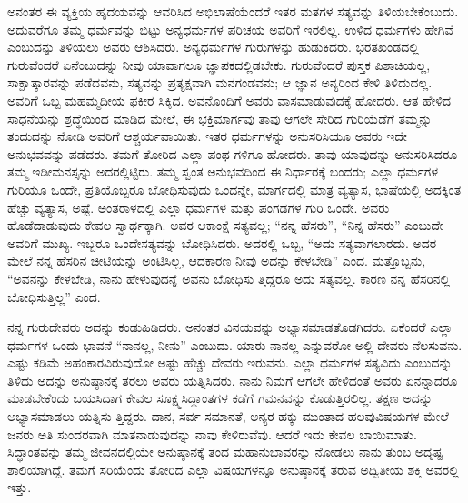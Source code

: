 ಅನಂತರ ಈ ವ್ಯಕ್ತಿಯ ಹೃದಯವನ್ನು ಆವರಿಸಿದ ಅಭಿಲಾಷೆಯೆಂದರೆ ಇತರ ಮತಗಳ ಸತ್ಯವನ್ನು ತಿಳಿಯಬೇಕೆಂಬುದು. ಅದುವರೆಗೂ ತಮ್ಮ ಧರ್ಮವನ್ನು ಬಿಟ್ಟು ಅನ್ಯಧರ್ಮಗಳ ಪರಿಚಯ ಅವರಿಗೆ ಇರಲಿಲ್ಲ. ಉಳಿದ ಧರ್ಮಗಳು ಹೇಗಿವೆ ಎಂಬುದನ್ನು ತಿಳಿಯಲು ಅವರು ಆಶಿಸಿದರು. ಅನ್ಯಧರ್ಮಗಳ ಗುರುಗಳನ್ನು ಹುಡುಕಿದರು. ಭರತಖಂಡದಲ್ಲಿ ಗುರುವೆಂದರೆ ಏನೆಂಬುದನ್ನು ನೀವು ಯಾವಾಗಲೂ ಜ್ಞಾಪಕದಲ್ಲಿಡಬೇಕು. ಗುರುವೆಂದರೆ ಪುಸ್ತಕ ಪಿಶಾಚಿಯಲ್ಲ, ಸಾಕ್ಷಾತ್ಕಾರವನ್ನು ಪಡೆದವನು, ಸತ್ಯವನ್ನು ಪ್ರತ್ಯಕ್ಷವಾಗಿ ಮನಗಂಡವನು; ಆ ಜ್ಞಾನ ಅನ್ಯರಿಂದ ಕೇಳಿ ತಿಳಿದುದಲ್ಲ. ಅವರಿಗೆ ಒಬ್ಬ ಮಹಮ್ಮದೀಯ ಫಕೀರ ಸಿಕ್ಕಿದ. ಅವನೊಂದಿಗೆ ಅವರು ವಾಸಮಾಡುವುದಕ್ಕೆ ಹೋದರು. ಆತ ಹೇಳಿದ ಸಾಧನೆಯನ್ನು ಶ್ರದ್ಧೆಯಿಂದ ಮಾಡಿದ ಮೇಲೆ, ಈ ಭಕ್ತಿಮಾರ್ಗವು ತಾವು ಆಗಲೇ ಸೇರಿದ ಗುರಿಯೆಡೆಗೆ ತಮ್ಮನ್ನು ತಂದುದನ್ನು ನೋಡಿ ಅವರಿಗೆ ಆಶ್ಚರ್ಯವಾಯಿತು. ಇತರ ಧರ್ಮಗಳನ್ನು ಅನುಸರಿಸಿಯೂ ಅವರು ಇದೇ ಅನುಭವವನ್ನು ಪಡೆದರು. ತಮಗೆ ತೋರಿದ ಎಲ್ಲಾ ಪಂಥ ಗಳಿಗೂ ಹೋದರು. ತಾವು ಯಾವುದನ್ನು ಅನುಸರಿಸಿದರೂ ತಮ್ಮ ಇಡೀಮನಸ್ಸನ್ನು ಅದರಲ್ಲಿಟ್ಟಿರು. ತಮ್ಮ ಸ್ವಂತ ಅನುಭವದಿಂದ ಈ ನಿರ್ಧಾರಕ್ಕೆ ಬಂದರು; ಎಲ್ಲಾ ಧರ್ಮಗಳ ಗುರಿಯೂ ಒಂದೇ, ಪ್ರತಿಯೊಬ್ಬರೂ ಬೋಧಿಸುವುದು ಒಂದನ್ನೇ, ಮಾರ್ಗದಲ್ಲಿ ಮಾತ್ರ ವ್ಯತ್ಯಾಸ, ಭಾಷೆಯಲ್ಲಿ ಅದಕ್ಕಿಂತ ಹೆಚ್ಚು ವ್ಯತ್ಯಾಸ, ಅಷ್ಟೆ. ಅಂತರಾಳದಲ್ಲಿ ಎಲ್ಲಾ ಧರ್ಮಗಳ ಮತ್ತು ಪಂಗಡಗಳ ಗುರಿ ಒಂದೇ. ಅವರು ಹೊಡೆದಾಡುವುದು ಕೇವಲ ಸ್ವಾರ್ಥಕ್ಕಾಗಿ. ಅವರ ಆಕಾಂಕ್ಷೆ ಸತ್ಯವಲ್ಲ; “ನನ್ನ ಹೆಸರು”, “ನಿನ್ನ ಹೆಸರು” ಎಂಬುದೇ ಅವರಿಗೆ ಮುಖ್ಯ. ಇಬ್ಬರೂ ಒಂದೇಸತ್ಯವನ್ನು ಬೋಧಿಸಿದರು. ಅದರಲ್ಲಿ ಒಬ್ಬ, “ಅದು ಸತ್ಯವಾಗಲಾರದು. ಅದರ ಮೇಲೆ ನನ್ನ ಹೆಸರಿನ ಚೀಟಿಯನ್ನು ಅಂಟಿಸಿಲ್ಲ, ಆದಕಾರಣ ನೀವು ಅದನ್ನು ಕೇಳಬೇಡಿ” ಎಂದ. ಮತ್ತೊಬ್ಬನು, “ಅವನನ್ನು ಕೇಳಬೇಡಿ, ನಾನು ಹೇಳುವುದನ್ನೆ ಅವನು ಬೋಧಿಸು ತ್ತಿದ್ದರೂ ಅದು ಸತ್ಯವಲ್ಲ. ಕಾರಣ ನನ್ನ ಹೆಸರಿನಲ್ಲಿ ಬೋಧಿಸುತ್ತಿಲ್ಲ” ಎಂದ.

ನನ್ನ ಗುರುದೇವರು ಅದನ್ನು ಕಂಡುಹಿಡಿದರು. ಅನಂತರ ವಿನಯವನ್ನು ಅಭ್ಯಾಸಮಾಡತೊಡಗಿದರು. ಏಕೆಂದರೆ ಎಲ್ಲಾ ಧರ್ಮಗಳ ಒಂದು ಭಾವನೆ “ನಾನಲ್ಲ, ನೀನು” ಎಂಬುದು. ಯಾರು ನಾನಲ್ಲ ಎನ್ನುವರೋ ಅಲ್ಲಿ ದೇವರು ನೆಲಸುವನು. ಎಷ್ಟು ಕಡಿಮೆ ಅಹಂಕಾರವಿರುವುದೋ ಅಷ್ಟು ಹೆಚ್ಚು ದೇವರು ಇರುವನು. ಎಲ್ಲಾ ಧರ್ಮಗಳ ಸತ್ಯವಿದು ಎಂಬುದನ್ನು ತಿಳಿದು ಅದನ್ನು ಅನುಷ್ಠಾನಕ್ಕೆ ತರಲು ಅವರು ಯತ್ನಿಸಿದರು. ನಾನು ನಿಮಗೆ ಆಗಲೇ ಹೇಳಿದಂತೆ ಅವರು ಏನನ್ನಾದರೂ ಮಾಡಬೇಕೆಂದು ಬಯಸಿದಾಗ ಕೇವಲ ಸೂಕ್ಷ್ಮಸಿದ್ಧಾಂತಗಳ ಕಡೆಗೆ ಗಮನವನ್ನು ಕೊಡುತ್ತಿರಲಿಲ್ಲ. ತಕ್ಷಣ ಅದನ್ನು ಅಭ್ಯಾಸಮಾಡಲು ಯತ್ನಿಸು ತ್ತಿದ್ದರು. ದಾನ, ಸರ್ವ ಸಮಾನತೆ, ಅನ್ಯರ ಹಕ್ಕು ಮುಂತಾದ ಹಲವುವಿಷಯಗಳ ಮೇಲೆ ಜನರು ಅತಿ ಸುಂದರವಾಗಿ ಮಾತನಾಡುವುದನ್ನು ನಾವು ಕೇಳಿರುವೆವು. ಆದರೆ ಇದು ಕೇವಲ ಬಾಯಿಮಾತು. ಸಿದ್ಧಾಂತವನ್ನು ತಮ್ಮ ಜೀವನದಲ್ಲಿಯೇ ಅನುಷ್ಠಾನಕ್ಕೆ ತಂದ ಮಹಾನುಭಾವರನ್ನು ನೋಡಲು ನಾನು ತುಂಬ ಅದೃಷ್ಟ ಶಾಲಿಯಾಗಿದ್ದೆ. ತಮಗೆ ಸರಿಯೆಂದು ತೋರಿದ ಎಲ್ಲಾ ವಿಷಯಗಳನ್ನೂ ಅನುಷ್ಠಾನಕ್ಕೆ ತರುವ ಅದ್ವಿತೀಯ ಶಕ್ತಿ ಅವರಲ್ಲಿ ಇತ್ತು.

